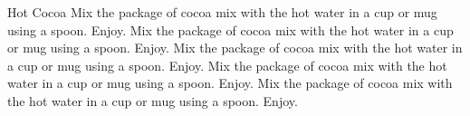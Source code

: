 \documentclass[fourbysix]{recipecard}
\begin{document}
 
 
\begin{recipe}{Hot Cocoa}{}
Mix the package of cocoa mix with the hot water in a cup or mug
using a spoon. Enjoy. Mix the package of cocoa mix with the hot
water in a cup or mug using a spoon. Enjoy. Mix the package of cocoa
mix with the hot water in a cup or mug using a spoon. Enjoy. Mix the
package of cocoa mix with the hot water in a cup or mug using a
spoon. Enjoy. Mix the package of cocoa mix with the hot water in a
cup or mug using a spoon. Enjoy.
\end{recipe}



\end{document}
